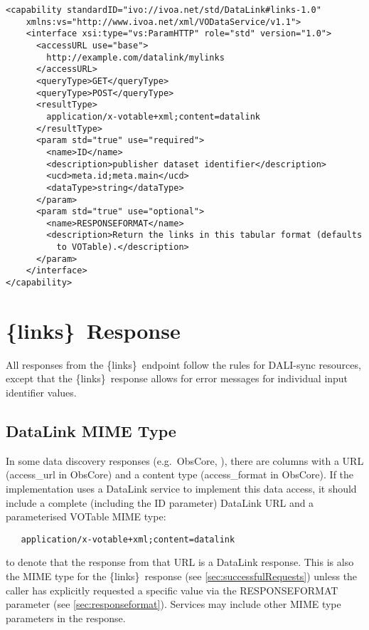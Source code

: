 \documentclass[11pt,a4paper]{ivoa}
\newcommand{\blinks}{\{links\}}
\begin{document}
\begin{verbatim}
<capability standardID="ivo://ivoa.net/std/DataLink#links-1.0"
    xmlns:vs="http://www.ivoa.net/xml/VODataService/v1.1">
    <interface xsi:type="vs:ParamHTTP" role="std" version="1.0">
      <accessURL use="base">
        http://example.com/datalink/mylinks
      </accessURL>
      <queryType>GET</queryType>
      <queryType>POST</queryType>
      <resultType>
        application/x-votable+xml;content=datalink
      </resultType>
      <param std="true" use="required">
        <name>ID</name>
        <description>publisher dataset identifier</description>
        <ucd>meta.id;meta.main</ucd>
        <dataType>string</dataType>
      </param>
      <param std="true" use="optional">
        <name>RESPONSEFORMAT</name>
        <description>Return the links in this tabular format (defaults
          to VOTable).</description>
      </param>
    </interface>
</capability>
\end{verbatim}

\section{\blinks\ Response}

All responses from the \blinks\ endpoint follow the rules for DALI-sync
resources, except that the \blinks\ response allows for error
messages for individual input identifier values.


\subsection{DataLink MIME Type}
\label{sec:mime}

In some data discovery responses (e.g.\ ObsCore, \citet{2017ivoa.spec.0509L}),
there are columns
with a URL (access\_url in ObsCore) and a content type (access\_format in
ObsCore). If the implementation uses a DataLink service to implement this
data access, it should include a complete (including the ID parameter)
DataLink URL and a parameterised VOTable MIME type:
\begin{verbatim}
   application/x-votable+xml;content=datalink
\end{verbatim}
to denote that the response from that URL is a DataLink response.
This is also the MIME type for the \blinks\ response
(see \ref{sec:successfulRequests})
unless the caller has explicitly requested a specific value
via the RESPONSEFORMAT parameter (see \ref{sec:responseformat}).
Services may include other MIME type parameters in the response.
\end{document}
